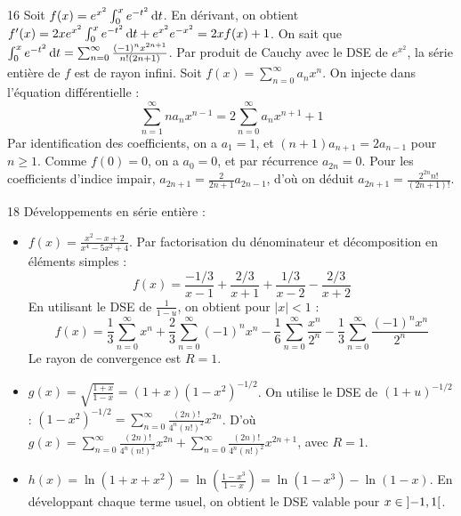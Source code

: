 \begin{correction}{16}
Soit $f(x) = e^{x^2} \int_0^x e^{-t^2} \,\mathrm{d}t$. 
En dérivant, on obtient $f'(x) = 2x e^{x^2} \int_0^x e^{-t^2} \,\mathrm{d}t + e^{x^2}e^{-x^2} = 2x f(x) + 1$. 
On sait que $\int_0^x e^{-t^2} \,\mathrm{d}t = \sum_{n=0}^\infty \frac{(-1)^n x^{2n+1}}{n!(2n+1)}$. 
Par produit de Cauchy avec le DSE de $e^{x^2}$, la série entière de $f$ est de rayon infini. 
Soit $f(x) = \sum_{n=0}^\infty a_n x^n$. On injecte dans l'équation différentielle : 
$$ \sum_{n=1}^\infty n a_n x^{n-1} = 2 \sum_{n=0}^\infty a_n x^{n+1} + 1 $$ 
Par identification des coefficients, on a $a_1 = 1$, et $(n+1)a_{n+1} = 2a_{n-1}$ pour $n \ge 1$. 
Comme $f(0)=0$, on a $a_0 = 0$, et par récurrence $a_{2n}=0$. 
Pour les coefficients d'indice impair, $a_{2n+1} = \frac{2}{2n+1} a_{2n-1}$, d'où on déduit $a_{2n+1} = \frac{2^{2n} n!}{(2n+1)!}$. 
\end{correction}

\begin{correction}{18}
Développements en série entière :
\begin{itemize}
 \item $f(x) = \frac{x^2-x+2}{x^4-5x^2+4}$. Par factorisation du dénominateur et décomposition en éléments simples : 
 $$ f(x) = \frac{-1/3}{x-1} + \frac{2/3}{x+1} + \frac{1/3}{x-2} - \frac{2/3}{x+2} $$ 
 En utilisant le DSE de $\frac{1}{1-u}$, on obtient pour $|x|<1$ : 
 $$ f(x) = \frac{1}{3} \sum_{n=0}^\infty x^n + \frac{2}{3} \sum_{n=0}^\infty (-1)^n x^n - \frac{1}{6} \sum_{n=0}^\infty \frac{x^n}{2^n} - \frac{1}{3} \sum_{n=0}^\infty \frac{(-1)^n x^n}{2^n} $$ 
 Le rayon de convergence est $R=1$. 
 \item $g(x) = \sqrt{\frac{1+x}{1-x}} = (1+x)(1-x^2)^{-1/2}$. 
 On utilise le DSE de $(1+u)^{-1/2}$ : $(1-x^2)^{-1/2} = \sum_{n=0}^\infty \frac{(2n)!}{4^n (n!)^2} x^{2n}$. 
 D'où $g(x) = \sum_{n=0}^\infty \frac{(2n)!}{4^n (n!)^2} x^{2n} + \sum_{n=0}^\infty \frac{(2n)!}{4^n (n!)^2} x^{2n+1}$, avec $R=1$. 
 \item $h(x) = \ln(1+x+x^2) = \ln\left(\frac{1-x^3}{1-x}\right) = \ln(1-x^3) - \ln(1-x)$. 
 En développant chaque terme usuel, on obtient le DSE valable pour $x \in \left]-1, 1\right[$. 
\end{itemize}
\end{correction}

